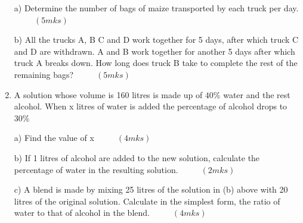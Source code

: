 \documentclass[
  a4paperpaper,
]{scrbook}
\begin{document}
\begin{tcolorbox}
\begin{enumerate}
  a) Determine the number of bags of maize transported by each truck per
  day. \(\hspace{1cm}(5mks)\)

  b) All the trucks A, B C and D work together for 5 days, after which
  truck C and D are withdrawn. A and B work together for another 5 days
  after which truck A breaks down. How long does truck B take to
  complete the rest of the remaining bags? \(\hspace{1cm}(5mks)\)
\item
  A solution whose volume is 160 litres is made up of \(40\%\) water and
  the rest alcohol. When x litres of water is added the percentage of
  alcohol drops to \(30\%\)

  a) Find the value of x \(\hspace{1cm} (4mks)\)

  b) If 1 litres of alcohol are added to the new solution, calculate the
  percentage of water in the resulting solution. \(\hspace{1cm} (2mks)\)

  c) A blend is made by mixing 25 litres of the solution in (b) above
  with 20 litres of the original solution. Calculate in the simplest
  form, the ratio of water to that of alcohol in the blend.
  \(\hspace{1cm} (4mks)\)
\end{enumerate}

\end{tcolorbox}
\end{document}

